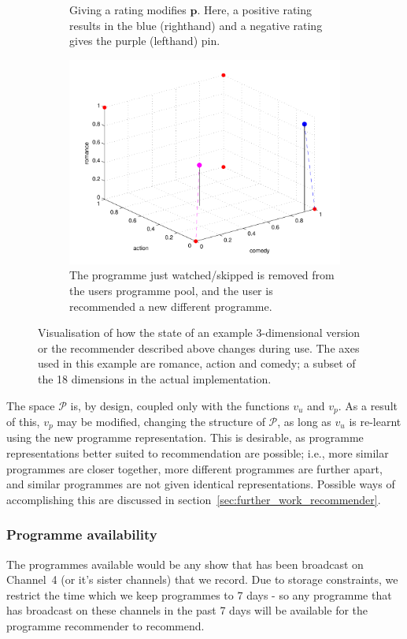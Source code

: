 \begin{figure}[h!]
\begin{center}
\begin{subfigure}[t]{0.32\textwidth}
					\caption{Giving a rating modifies $\mathbf{p}$. Here, a positive rating results in the blue (righthand) and a negative rating gives the purple (lefthand) pin.}
				\end{subfigure}
				\begin{subfigure}[t]{0.32\textwidth}
					\includegraphics[width=\textwidth]{images/recommender_3.pdf}
					\caption{The programme just watched/skipped is removed from the users programme pool, and the user is recommended a new different programme.}
				\end{subfigure}
				\caption{Visualisation of how the state of an example 3-dimensional version or the recommender described above changes during use. The axes used in this example are romance, action and comedy; a subset of the 18 dimensions in the actual implementation.}
				\label{fig:recommender_example}
			\end{center}
		\end{figure}

		The space $\mathcal{P}$ is, by design, coupled only with the functions $v_u$ and $v_p$. As a result of this, $v_p$ may be modified, changing the structure of $\mathcal{P}$, as long as $v_u$ is re-learnt using the new programme representation. This is desirable, as programme representations better suited to recommendation are possible; i.e., more similar programmes are closer together, more different programmes are further apart, and similar programmes are not given identical representations. Possible ways of accomplishing this are discussed in section~\ref{sec:further_work_recommender}.

	\subsubsection{Programme availability}

		The programmes available would be any show that has been broadcast on Channel~4 (or it's sister channels) that we record. Due to storage constraints, we restrict the time which we keep programmes to 7 days - so any programme that has broadcast on these channels in the past 7 days will be available for the programme recommender to recommend.
